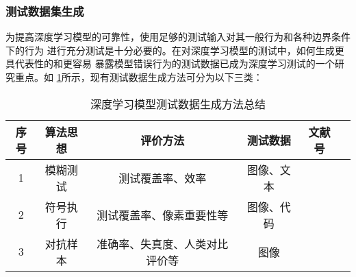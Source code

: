 \subsubsection{测试数据集生成}

为提高深度学习模型的可靠性，使用足够的测试输入对其一般行为和各种边界条件下的行为
进行充分测试是十分必要的。在对深度学习模型的测试中，如何生成更具代表性的和更容易
暴露模型错误行为的测试数据已成为深度学习测试的一个研究重点。如
\cref{tab:testingDataGen}所示，现有测试数据生成方法可分为以下三类：

\begin{table}[htp]
	\renewcommand\arraystretch{1.5}
	\small
	\centering
	\caption{深度学习模型测试数据生成方法总结}
	\label{tab:testingDataGen}
	\begin{tabular}{cccccc}
		\toprule
		\textbf{序号} & \textbf{算法思想} & \textbf{评价方法}               & \textbf{测试数据} & \textbf{文献号}             \\
		\midrule
		1             & 模糊测试          & 测试覆盖率、效率 & 图像、文本 & \cite{Odena2019TensorFuzz}\cite{Guo2018DLFuzz}\cite{xie2019coverage} \\
		2             & 符号执行          & 测试覆盖率、像素重要性等                              & 图像、代码              & \cite{Gopinath2018Symbolic}\cite{Sun2018Concolic} \\
		3             & 对抗样本          & 准确率、失真度、人类对比评价等 & 图像 & \cite{Xiao2018Spatially}\cite{Wicker2018FeatureGuided}\cite{He2018Decision} \\
		\bottomrule
	\end{tabular}
\end{table}


